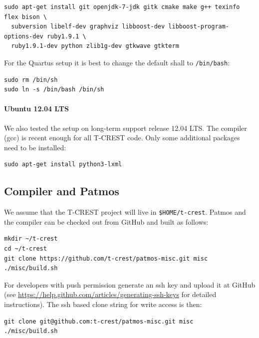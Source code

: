 \documentclass[a4paper,fontsize=10pt,twoside,DIV15,BCOR12mm,headinclude=true,footinclude=false,pagesize,bibtotoc]{scrbook}
\newcommand{\code}[1]{{\texttt{#1}}}
\begin{document}
\begin{verbatim}
sudo apt-get install git openjdk-7-jdk gitk cmake make g++ texinfo flex bison \
  subversion libelf-dev graphviz libboost-dev libboost-program-options-dev ruby1.9.1 \
  ruby1.9.1-dev python zlib1g-dev gtkwave gtkterm
\end{verbatim}

For the Quartus setup it is best to change the default shall to \code{/bin/bash}:

\begin{verbatim}
sudo rm /bin/sh
sudo ln -s /bin/bash /bin/sh
\end{verbatim}

\paragraph{Ubuntu 12.04 LTS}

We also tested the setup on long-term support release 12.04 LTS. The compiler
(gcc) is recent enough for all T-CREST code. Only some additional packages need to
be installed:

\begin{verbatim}
sudo apt-get install python3-lxml
\end{verbatim}

\subsection{Compiler and Patmos}
\label{sec:build:compiler}

We assume that the T-CREST project will live in \code{\$HOME/t-crest}.
Patmos and the compiler can be checked out from GitHub and built as follows:

\begin{verbatim}
mkdir ~/t-crest
cd ~/t-crest
git clone https://github.com/t-crest/patmos-misc.git misc
./misc/build.sh
\end{verbatim}

For developers with push permission generate an ssh key and upload
it at GitHub (see \url{https://help.github.com/articles/generating-ssh-keys}
for detailed instructions).
The ssh based clone string for write access is then:

\begin{verbatim}
git clone git@github.com:t-crest/patmos-misc.git misc
./misc/build.sh
\end{verbatim}
\end{document}
